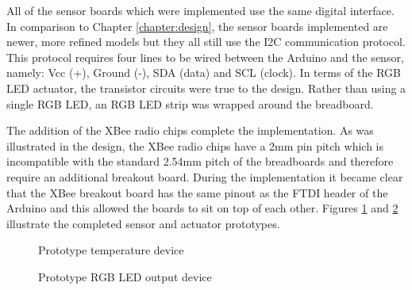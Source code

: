       All of the sensor boards which were implemented use the same digital interface. In comparison to Chapter \ref{chapter:design}, the sensor boards implemented are newer, more refined models but they all still use the I2C communication protocol. This protocol requires four lines to be wired between the Arduino and the sensor, namely: Vcc (+), Ground (-), SDA (data) and SCL (clock). In terms of the RGB LED actuator, the transistor circuits were true to the design. Rather than using a single RGB LED, an RGB LED strip was wrapped around the breadboard.

      The addition of the XBee radio chips complete the implementation. As was illustrated in the design, the XBee radio chips have a 2mm pin pitch which is incompatible with the standard 2.54mm pitch of the breadboards and therefore require an additional breakout board. During the implementation it became clear that the XBee breakout board has the same pinout as the FTDI header of the Arduino and this allowed the boards to sit on top of each other. Figures \ref{figure:temp-device} and \ref{figure:led-device} illustrate the completed sensor and actuator prototypes.

      \begin{figure}
        \centering
        \caption{Prototype temperature device}\label{figure:temp-device}
      \end{figure}

      \begin{figure}
        \centering
        \caption{Prototype RGB LED output device}\label{figure:led-device}
      \end{figure}

